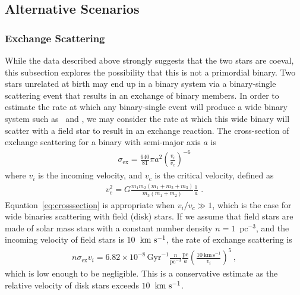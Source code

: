 \documentclass[12pt,letterpaper,margin=1in]{article}
\newcommand{\eqname}{Equation}
\newcommand{\sunanalog}{\text{Krios}}
\newcommand{\bizarreone}{\text{Kronos}}
\newcommand{\kms}{\ensuremath{\rm km~s^{-1}}}
\begin{document}
\subsection{Alternative Scenarios}

\subsubsection{Exchange Scattering}
\label{sub:exchange_scattering}

While the data described above strongly suggests that the two stars are
coeval, this subsection explores the possibility that this is not a primordial
binary.
Two stars unrelated at birth may end up in a binary system via a binary-single
scattering event that results in an exchange of binary members.
In order to estimate the rate at which any binary-single
event will produce a wide binary system such as \sunanalog\ and \bizarreone,
we may consider the rate at which this wide binary will scatter with a field star to
result in an exchange reaction.
The cross-section of exchange scattering for a binary with semi-major axis $a$ is
\cite{Hut:1983ab,Hut:1983aa}
\begin{eqnarray}
  \sigma_\mathrm{ex} = \frac{640}{81} \pi a^{2} \left(\frac{v_i}{v_c}\right)^{-6}
  \label{eq:crosssection}
\end{eqnarray}
where $v_i$ is the incoming velocity, and $v_c$ is the critical velocity,
defined as
\begin{eqnarray}
  v_c^2 = G \frac{m_1 m_2 (m_1 + m_2 + m_3)}{m_3 (m_1 + m_2)} \frac{1}{a}\,\,.
\end{eqnarray}
\eqname~\ref{eq:crosssection} is appropriate when $v_i/v_c \gg 1$,
which is the case for wide binaries
scattering with field (disk) stars.
If we assume that field stars are made of solar mass stars with a constant
number density $n=1$~pc$^{-3}$, and the incoming velocity of field stars is
$10$~\kms, the rate of exchange scattering is
\begin{eqnarray}
  n \sigma_\mathrm{ex} v_i = 6.82\times 10^{-8}\,\mathrm{Gyr}^{-1}
  \frac{n}{\mathrm{pc}^{-3}} \frac{\mathrm{pc}}{a}
  \left(\frac{10~\mathrm{km}\,\mathrm{s}^{-1}}{v_i}\right)^5\,,
\end{eqnarray}
which is low enough to be negligible.
This is a conservative estimate as the relative velocity of
disk stars exceeds $10$~\kms.
\end{document}
